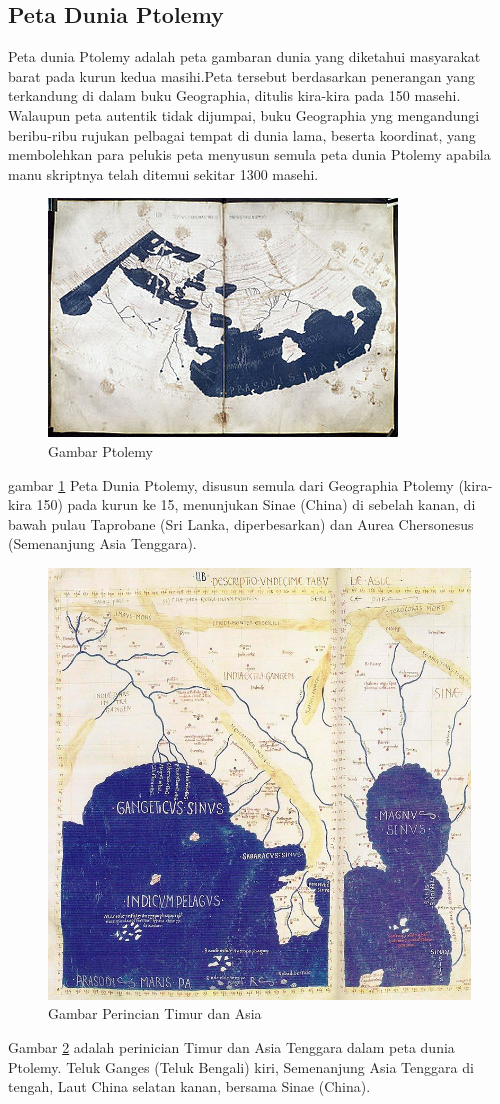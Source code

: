 \subsection{Peta Dunia Ptolemy}
		Peta dunia Ptolemy adalah peta gambaran dunia yang diketahui masyarakat barat pada kurun kedua masihi.Peta tersebut berdasarkan penerangan yang terkandung di dalam buku Geographia, ditulis kira-kira pada 150 masehi. Walaupun peta autentik tidak dijumpai, buku Geographia yng mengandungi beribu-ribu rujukan pelbagai tempat di dunia lama, beserta koordinat, yang membolehkan para pelukis peta menyusun semula peta dunia Ptolemy apabila manu skriptnya telah ditemui sekitar 1300 masehi.
	\begin{figure} [ht]
	\centerline{\includegraphics[width=.5\textwidth]{figures/PtolemyWorldMap}}
	\caption{Gambar Ptolemy}	
	\label{PtolemyWorldMap}
	\end{figure}
	gambar \ref {PtolemyWorldMap} Peta Dunia Ptolemy, disusun semula dari Geographia Ptolemy (kira-kira 150) pada kurun ke 15, menunjukan Sinae (China) di sebelah kanan, di bawah pulau Taprobane (Sri Lanka, diperbesarkan) dan Aurea Chersonesus (Semenanjung Asia Tenggara).

	\begin{figure} [ht]
	\centerline{\includegraphics[width=.5\textwidth]{figures/PtolemyAsiadetail}}	
	\caption{Gambar Perincian Timur dan Asia}
	\label{PtolemyAsiadetail}		
	\end{figure}
	Gambar \ref{PtolemyAsiadetail} adalah perinician Timur dan Asia Tenggara dalam peta dunia Ptolemy. Teluk Ganges (Teluk Bengali) kiri, Semenanjung Asia Tenggara di tengah, Laut China selatan kanan, bersama Sinae (China).
	
